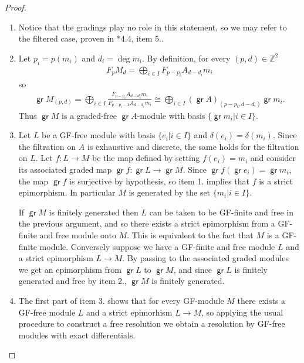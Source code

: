 \documentclass[11pt,fleqn]{article}
\theoremstyle{plain}
\theoremstyle{remark}
\theoremstyle{definition}
\newcommand\ZZ{\mathbb Z}
\renewcommand\to{\longrightarrow}
\DeclareMathOperator\gr{\mathsf{gr}}
\begin{document}
\begin{proof}
\begin{enumerate}
	\item Notice that the gradings play no role in this statement, so we may
	refer to the filtered case, proven in \cite{VO}*{4.4, item 5.}.

	\item Let $p_i = p(m_i)$ and $d_i = \deg m_i$. By definition, for every $(p,d) \in 
	\ZZ^2$ 
	\begin{align*}
	  F_pM_d = \bigoplus_{i \in I} F_{p -p_i}A_{d-d_i} m_i
	\end{align*}
	so
	\begin{align*}
 	  \gr M_{(p,d)} = \bigoplus_{i \in I} \frac{F_{p-p_i}A_{d-d_i}
	  m_i}{F_{p-p_i-1}A_{d-d_i}{m_i}} \cong \bigoplus_{i \in I} (\gr
	  A)_{(p-p_i,d-d_i)} \gr m_i. 
	\end{align*}
	Thus $\gr M$ is a graded-free $\gr A$-module with basis $\{\gr m_i|i \in I\}$.

	\item Let $L$ be a GF-free module with basis $\{e_i|i \in I\}$ and
	$\delta(e_i) = \delta(m_i)$. Since the filtration on $A$ is exhaustive and
	discrete, the same holds for the filtration on $L$. Let $f: L \to M$ be the map
	defined by setting $f(e_i) = m_i$ and consider its associated graded map $\gr f: \gr
	L \to \gr M$. Since $\gr f(\gr e_i) = \gr m_i$, the map $\gr f$ is surjective by 
	hypothesis, so item 1. implies that $f$ is a strict epimorphism. In particular $M$
	is generated by the set $\{m_i|i \in I\}$. 
		
	If $\gr M$ is finitely generated then $L$ can be taken to be GF-finite and free in
	the previous argument, and so there exists a strict epimorphism from a GF-finite and 
	free module onto $M$. This is equivalent to the fact that $M$ is a GF-finite module. 
	Conversely suppose we have a GF-finite and free module $L$ and a strict epimorphism $L
	\to M$. By passing to the associated graded modules we get an epimorphism
	from $\gr L$ to $\gr M$, and since $\gr L$ is finitely generated and free by item
	2., $\gr M$ is finitely generated.

	\item The first part of item 3. shows that for every GF-module $M$ there
	exists a GF-free module $L$ and a strict epimorhism $L \to M$, so applying the
	usual procedure to construct a free resolution we obtain a resolution by GF-free
	modules with exact differentials. 
	

\end{enumerate}
\end{proof}
\end{document}
